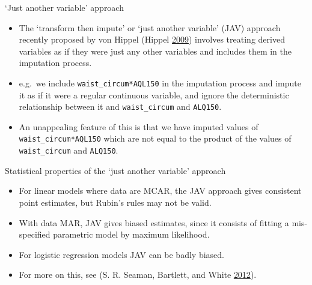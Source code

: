 \documentclass[ignorenonframetext,]{beamer}
\providecommand{\tightlist}{%
  \setlength{\itemsep}{0pt}\setlength{\parskip}{0pt}}
\begin{document}
\begin{frame}[fragile]{`Just another variable' approach}
\protect\hypertarget{just-another-variable-approach}{}

\begin{itemize}
\tightlist
\item
  The `transform then impute' or `just another variable' (JAV) approach
  recently proposed by von Hippel (Hippel
  \protect\hyperlink{ref-Hippel2009}{2009}) involves treating derived
  variables as if they were just any other variables and includes them
  in the imputation process.
\item
  e.g.~we include \texttt{waist\_circum*AQL150} in the imputation
  process and impute it as if it were a regular continuous variable, and
  ignore the deterministic relationship between it and
  \texttt{waist\_circum} and \texttt{ALQ150}.
\item
  An unappealing feature of this is that we have imputed values of
  \texttt{waist\_circum*AQL150} which are not equal to the product of
  the values of \texttt{waist\_circum} and \texttt{ALQ150}.
\end{itemize}

\end{frame}

\begin{frame}{Statistical properties of the `just another variable'
approach}
\protect\hypertarget{statistical-properties-of-the-just-another-variable-approach}{}

\begin{itemize}
\tightlist
\item
  For linear models where data are MCAR, the JAV approach gives
  consistent point estimates, but Rubin's rules may not be valid.
\item
  With data MAR, JAV gives biased estimates, since it consists of
  fitting a mis-specified parametric model by maximum likelihood.
\item
  For logistic regression models JAV can be badly biased.
\item
  For more on this, see (S. R. Seaman, Bartlett, and White
  \protect\hyperlink{ref-Seaman2012}{2012}).
\end{itemize}

\end{frame}
\end{document}
